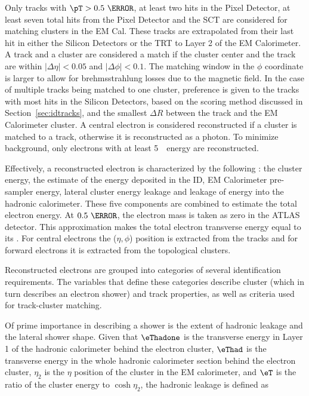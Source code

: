 \par Only tracks with $\pT>0.5~\GeV$, at least 
two hits in the Pixel Detector, at least seven total hits from the Pixel Detector and the SCT are 
considered for matching clusters in the EM Cal. These tracks are extrapolated from 
their last hit in either the Silicon Detectors or the TRT to Layer 2 of the EM Calorimeter.
A track and a cluster are considered a match if the cluster center and the track are within 
$|\Delta\eta|<0.05$ and $|\Delta\phi|<0.1$. The matching window in the $\phi$ coordinate 
is larger to allow for brehmsstrahlung losses due to the magnetic field. In the case of multiple tracks being matched 
to one cluster, preference is given to the tracks with most hits in the Silicon Detectors, based 
on the scoring method discussed in Section~\ref{sec:idtracks}, and the smallest  
$\Delta R$ between the track and the EM Calorimeter cluster. A central electron 
is considered reconstructed if a cluster is matched to a track, otherwise it is reconstructed as 
a photon. To minimize background, only electrons with at least 5~\GeV\ energy are reconstructed. 

\par Effectively, a reconstructed electron is characterized by the following : the cluster energy, the estimate 
of the energy deposited in the ID, EM Calorimeter pre-sampler energy, lateral cluster energy leakage and leakage 
of energy into the hadronic calorimeter. These five components are combined to estimate the total 
electron energy. At $0.5~\MeV$, the electron mass is taken as zero in the ATLAS detector. This approximation 
makes the total electron transverse energy equal to its \pT. 
For central electrons the ($\eta,\phi$) position is extracted from the tracks and  
for forward electrons it is extracted from the topological clusters.   

\par Reconstructed electrons are grouped into categories of several identification 
requirements. The variables that define these categories describe cluster (which in turn describes an electron shower) and 
track properties, as well as criteria used for track-cluster matching. 

\par Of prime importance in describing a shower is the extent of hadronic leakage and the lateral 
shower shape. Given that $\eThadone$ is the transverse energy in Layer 1 of the hadronic 
calorimeter behind the electron cluster, $\eThad$ is the transverse energy 
in the whole hadronic calorimeter section behind the electron cluster, $\eta_2$ is the 
$\eta$ position of the cluster in the EM calorimeter, and $\eT$ is the ratio of the 
cluster energy to $\cosh\eta_2$, the hadronic leakage is defined as 



